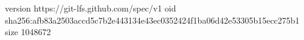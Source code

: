 version https://git-lfs.github.com/spec/v1
oid sha256:afb83a2503accd5c7b2e443134e43ec0352424f1ba06d42e53305b15ecc275b1
size 1048672
